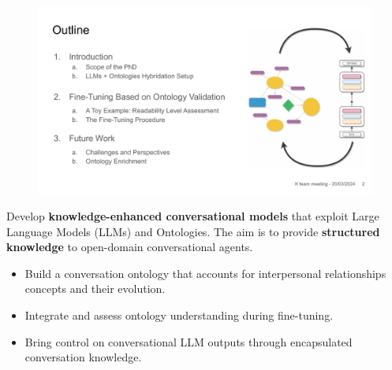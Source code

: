 \documentclass[a0paper,portrait]{baposter}
\begin{document}
\begin{poster}
{\begin{figure}
    \vspace{-15pt}
    \begin{center}
        \includegraphics[width=\linewidth]{general-idea.pdf}
    \end{center}
\end{figure}
\vspace*{0.1em}
Develop \textbf{knowledge-enhanced conversational models} that exploit Large Language Models (LLMs) and Ontologies. The aim is to provide \textbf{structured knowledge} to open-domain conversational agents.

\begin{itemize}
    \item Build a conversation ontology that accounts for interpersonal relationships concepts and their evolution.
    \item Integrate and assess ontology understanding during ﬁne-tuning.
    \item Bring control on conversational LLM outputs through encapsulated conversation knowledge.
\end{itemize}
\vspace*{0.3em}
}


\end{poster}
\end{document}
